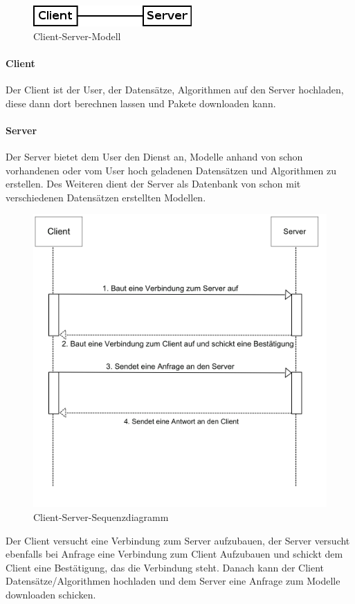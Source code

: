 %

\begin{figure}[h]
	\centering
	\includegraphics[width=0.5\linewidth]{Grafik/Diagramm/Pattern/ClientServer/Kontext.png}
	\caption[]{Client-Server-Modell}
\end{figure}

\paragraph{Client}
Der Client ist der User, der Datensätze, Algorithmen auf den Server hochladen, diese dann dort berechnen lassen und Pakete downloaden kann.

\paragraph{Server}
Der Server bietet dem User den Dienst an, Modelle anhand von schon vorhandenen oder vom User hoch geladenen Datensätzen und Algorithmen zu erstellen. Des Weiteren dient der Server als Datenbank von schon mit verschiedenen Datensätzen erstellten Modellen.\\

\begin{figure}[h]
	\centering
	\includegraphics[width=0.6\linewidth]{Grafik/Diagramm/Pattern/ClientServer/Sequenzdiagramm.png}
	\caption[]{Client-Server-Sequenzdiagramm}
\end{figure}\pagebreak
Der Client versucht eine Verbindung zum Server aufzubauen, der Server versucht ebenfalls bei Anfrage eine Verbindung zum Client Aufzubauen und schickt dem Client eine Bestätigung, das die Verbindung steht. Danach kann der Client Datensätze/Algorithmen hochladen und dem Server eine Anfrage zum Modelle downloaden schicken.

